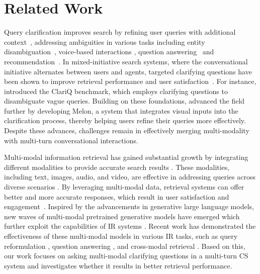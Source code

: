 \documentclass[11pt]{article}
\begin{document}
\section{Related Work}
Query clarification improves search by refining user queries with additional context~\cite{queryclarification}, addressing ambiguities in various tasks including entity disambiguation~\cite{Coden2015DidYM}, voice-based interactions \cite{10.1145/3209978.3210160}, question answering~\cite{QAclarifyingquestion} and recommendation~\cite{recommenderCQ}.
In mixed-initiative search systems, where the conversational initiative alternates between users and agents, targeted clarifying questions have been shown to improve retrieval performance and user satisfaction~\cite{rahmani-etal-2024-clarifying,DBLP:journals/corr/abs-2410-19692}. For instance, \citet{DBLP:journals/corr/abs-2009-11352} introduced the ClariQ benchmark, which employs clarifying questions to disambiguate vague queries. Building on these foundations, \citet{yuan2024askingmultimodalclarifyingquestions} advanced the field further by developing Melon, a system that integrates visual inputs into the clarification process, thereby helping users refine their queries more effectively. Despite these advances, challenges remain in effectively merging multi-modality with multi-turn conversational interactions.









 Multi-modal information retrieval has gained substantial growth by integrating different modalities to provide accurate search results \cite{MMIR}. These modalities, including text, images, audio, and video, are effective in addressing queries across diverse scenarios \cite{MMIR,yuan2024askingmultimodalclarifyingquestions}. By leveraging multi-modal data, retrieval systems can offer better and more accurate responses, which result in user satisfaction and engagement~\cite{DBLP:journals/corr/cs-IR-0311029}. Inspired by the advancements in generative large language models, new waves of multi-modal pretrained generative models have emerged which further exploit the capabilities of IR systems \cite{DBLP:journals/corr/abs-2103-00020,DBLP:journals/corr/abs-2005-09801}. Recent work has demonstrated the effectiveness of these multi-modal models in various IR tasks, such as query reformulation \cite{garg2021multimodal}, question answering \cite{Xu2019AskingCQ}, and cross-modal retrieval \cite{DBLP:journals/corr/abs-2005-09801}. Based on this, our work focuses on asking multi-modal clarifying questions in a multi-turn \ac{CS} system and investigates whether it results in better retrieval performance.
\end{document}
